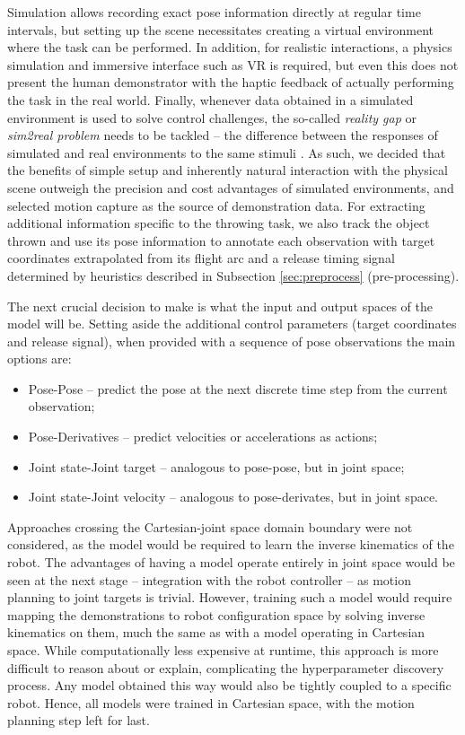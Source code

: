 \documentclass{article}
\begin{document}
Simulation allows recording exact pose information directly at regular time intervals, but setting up the scene necessitates creating a virtual environment where the task can be performed. In addition, for realistic interactions, a physics simulation and immersive interface such as VR is required, but even this does not present the human demonstrator with the haptic feedback of actually performing the task in the real world. Finally, whenever data obtained in a simulated environment is used to solve control challenges, the so-called \emph{reality gap} or \emph{sim2real problem} needs to be tackled -- the difference between the responses of simulated and real environments to the same stimuli \cite{hofer2021sim2real}. As such, we decided that the benefits of simple setup and inherently natural interaction with the physical scene outweigh the precision and cost advantages of simulated environments, and selected motion capture as the source of demonstration data. For extracting additional information specific to the throwing task, we also track the object thrown and use its pose information to annotate each observation with target coordinates extrapolated from its flight arc and a release timing signal determined by heuristics described in Subsection \ref{sec:preprocess} (pre-processing).

The next crucial decision to make is what the input and output spaces of the model will be. Setting aside the additional control parameters (target coordinates and release signal), when provided with a sequence of pose observations the main options are:
\begin{itemize}
	\item Pose-Pose -- predict the pose at the next discrete time step from the current observation;
	\item Pose-Derivatives -- predict velocities or accelerations as actions;
	\item Joint state-Joint target -- analogous to pose-pose, but in joint space;
	\item Joint state-Joint velocity -- analogous to pose-derivates, but in joint space.
\end{itemize}

Approaches crossing the Cartesian-joint space domain boundary were not considered, as the model would be required to learn the inverse kinematics of the robot. The advantages of having a model operate entirely in joint space would be seen at the next stage -- integration with the robot controller -- as motion planning to joint targets is trivial. However, training such a model would require mapping the demonstrations to robot configuration space by solving inverse kinematics on them, much the same as with a model operating in Cartesian space. While computationally less expensive at runtime, this approach is more difficult to reason about or explain, complicating the hyperparameter discovery process. Any model obtained this way would also be tightly coupled to a specific robot. Hence, all models were trained in Cartesian space, with the motion planning step left for last.
\end{document}
